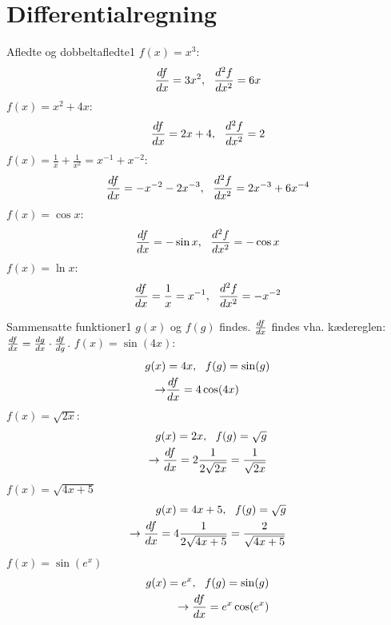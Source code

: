 \section*{Differentialregning}
\begin{opgave}{Afledte og dobbeltafledte}{1}
\opg $f(x) = x^3$: 
\begin{equation*}
{d{f} \over d{x}}=3x^2,~~ {d^2{f} \over d{x}^2}=6x
\end{equation*}
\opg $f(x) = x^2 + 4x$:
\begin{equation*}
{d{f} \over d{x}}=2x+4,~~ {d^2{f} \over d{x}^2}=2
\end{equation*}
\opg $f(x) = \frac{1}{x} + \frac{1}{x^2}=x^{-1}+x^{-2}$: 
\begin{equation*}
{d{f} \over d{x}} = - x^{-2}-2x^{-3}, ~~{d^2{f} \over d{x}^2}=2x^{-3}+6x^{-4}
\end{equation*}
\opg $f(x) = \cos x$: 
\begin{equation*}
{d{f} \over d{x}}= - \sin x,~~ {d^2{f} \over d{x}^2}=-\cos x
\end{equation*}
\opg $f(x) = \ln x$: 
\begin{equation*}
{d{f} \over d{x}}= \frac{1}{x}=x^{-1},~~{d^2{f} \over d{x}^2}=-x^{-2}
\end{equation*}
\end{opgave}

\begin{opgave}{Sammensatte funktioner}{1}
$g(x)$ og $f(g)$ findes. ${d{f} \over d{x}}$ findes vha. kædereglen: ${d{f} \over d{x}} = {d{g} \over d{x}} \cdot {d{f} \over d{g}}$.
\opg $f(x) = \sin (4x)$:
\begin{align*}
g(x) &= 4x, ~~f(g)=\sin(g) \\
\rightarrow &{d{f} \over d{x}} = 4\cos(4x)
\end{align*}
\opg $f(x) = \sqrt{2x}$:
\begin{align*}
g(x) = 2x, ~~ f(g)=\sqrt{g} \\
\rightarrow {d{f} \over d{x}} = 2\frac{1}{2\sqrt{2x}}=\frac{1}{\sqrt{2x}}
\end{align*}
\opg $f(x) = \sqrt{4x+5}$
\begin{align*}
g(x) = 4x+5, ~~f(g)=\sqrt{g} \\
\rightarrow {d{f} \over d{x}} = 4\frac{1}{2\sqrt{4x+5}}=\frac{2}{\sqrt{4x+5}}
\end{align*}
\opg $f(x) = \sin(e^x)$
\begin{align*}
g(x) = e^x, ~~f(g)=\sin(g) \\
\rightarrow {d{f} \over d{x}} = e^x \cos(e^x)
\end{align*}
\end{opgave}



